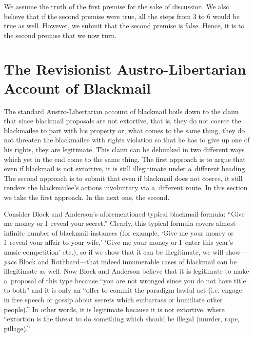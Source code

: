 We assume the truth of the first premise for the sake of discussion. We also believe that if the second premise were true, all the steps from 3 to 6 would be true as well. However, we submit that the second premise is false. Hence, it is to the second premise that we now turn.



\section{The Revisionist Austro-Libertarian Account of Blackmail}

The standard Austro-Libertarian account of blackmail boils down to the claim that since blackmail proposals are not extortive, that is, they do not coerce the blackmailee to part with his property or, what comes to the same thing, they do not threaten the blackmailee with rights violation so that he has to give up one of his rights, they are legitimate. This claim can be debunked in two different ways which yet in the end come to the same thing. The first approach is to argue that even if blackmail is not extortive, it is still illegitimate under a~different heading. The second approach is to submit that even if blackmail does not coerce, it still renders the blackmailee's actions involuntary via a~different route. In this section we take the first approach. In the next one, the second.



Consider Block and Anderson's 
\parencite*[][p.546]{block_blackmail_2000} %
 aforementioned typical blackmail formula: ``Give me money or I~reveal your secret.'' Clearly, this typical formula covers almost infinite number of blackmail instances (for example, ‘Give me your money or I~reveal your affair to your wife,' ‘Give me your money or I~enter this year's music competition' etc.), so if we show that it can be illegitimate, we will show---\textit{pace} Block and Rothbard---that indeed innumerable cases of blackmail can be illegitimate as well. Now Block and Anderson 
\parencite*[][p.546]{block_blackmail_2000} %
 believe that it is legitimate to make a~proposal of this type because ``you are not wronged since you do not have title to both'' and it is only an ``offer to commit the paradigm lawful act (i.e. engage in free speech or gossip about secrets which embarrass or humiliate other people).'' In other words, it is legitimate because it is not extortive, where ``extortion is the threat to do something which should be illegal (murder, rape, pillage).''



